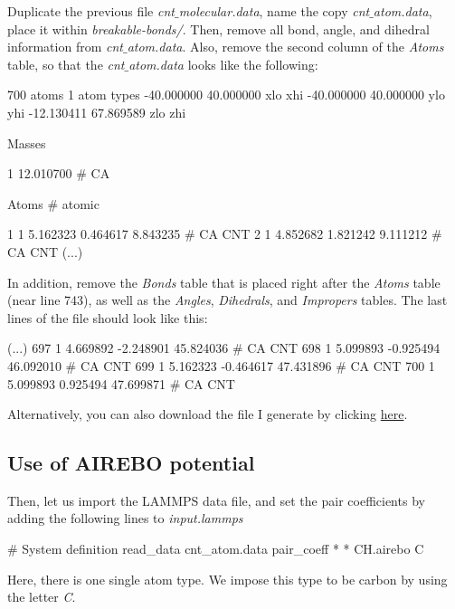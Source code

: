 \vspace{0.25cm} \noindent Duplicate the previous file \textit{cnt$\_$molecular.data}, name the copy \textit{cnt$\_$atom.data},
place it within \textit{breakable-bonds/}. Then, remove all bond, angle, and dihedral 
information from \textit{cnt$\_$atom.data}. Also, remove the second column of the 
\textit{Atoms} table, so that the \textit{cnt$\_$atom.data} looks like the following: 

\begin{lcverbatim}
700 atoms
1 atom types
-40.000000 40.000000  xlo xhi
-40.000000 40.000000  ylo yhi
-12.130411 67.869589  zlo zhi

Masses

1 12.010700 # CA

Atoms # atomic

1 1 5.162323 0.464617 8.843235 # CA CNT
2 1 4.852682 1.821242 9.111212 # CA CNT
(...)
\end{lcverbatim}

\noindent In addition, remove the \textit{Bonds} table that is placed right after the 
\textit{Atoms} table (near line 743), as well as the \textit{Angles}, \textit{Dihedrals}, 
and \textit{Impropers} tables. The last lines of the file should look like this:

\begin{lcverbatim}
(...)
697 1 4.669892 -2.248901 45.824036 # CA CNT
698 1 5.099893 -0.925494 46.092010 # CA CNT
699 1 5.162323 -0.464617 47.431896 # CA CNT
700 1 5.099893 0.925494 47.699871 # CA CNT
\end{lcverbatim}

\noindent Alternatively, you can also download the file I generate 
by clicking \href{https://lammpstutorials.github.io/lammpstutorials-inputs/level1/breaking-a-carbon-nanotube/breakable-bonds/cnt_atom.data}{here}.

\subsection{Use of AIREBO potential}
\noindent Then, let us import the LAMMPS data file, and set the
pair coefficients by adding the following lines to \textit{input.lammps}

\begin{lcverbatim}
# System definition
read_data cnt_atom.data
pair_coeff * * CH.airebo C
\end{lcverbatim}

\noindent Here, there is one single atom type. We impose this type
to be carbon by using the letter \textit{C}.

